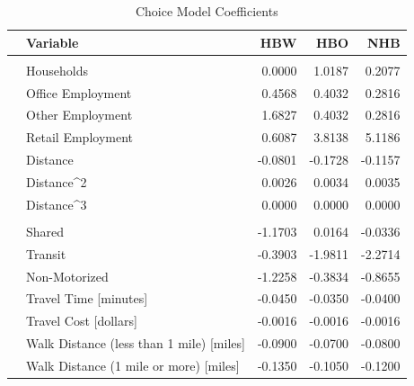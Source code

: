 \begin{table}

\caption{\label{tab:coeffs}Choice Model Coefficients}
\centering
\begin{tabular}[t]{llrrr}
\toprule
 & Variable & HBW & HBO & NHB\\
\midrule
\addlinespace[0.3em]
\multicolumn{5}{l}{\textbf{Destination Choice}}\\
\hspace{1em} & Households & 0.0000 & 1.0187 & 0.2077\\

\hspace{1em} & Office Employment & 0.4568 & 0.4032 & 0.2816\\

\hspace{1em} & Other Employment & 1.6827 & 0.4032 & 0.2816\\

\hspace{1em} & Retail Employment & 0.6087 & 3.8138 & 5.1186\\

\hspace{1em} & Distance & -0.0801 & -0.1728 & -0.1157\\

\hspace{1em} & Distance\textasciicircum{}2 & 0.0026 & 0.0034 & 0.0035\\

\hspace{1em} & Distance\textasciicircum{}3 & 0.0000 & 0.0000 & 0.0000\\
\cmidrule{1-5}
\addlinespace[0.3em]
\multicolumn{5}{l}{\textbf{Mode Choice}}\\
\hspace{1em} & Shared & -1.1703 & 0.0164 & -0.0336\\

\hspace{1em} & Transit & -0.3903 & -1.9811 & -2.2714\\

\hspace{1em} & Non-Motorized & -1.2258 & -0.3834 & -0.8655\\

\hspace{1em} & Travel Time [minutes] & -0.0450 & -0.0350 & -0.0400\\

\hspace{1em} & Travel Cost [dollars] & -0.0016 & -0.0016 & -0.0016\\

\hspace{1em} & Walk Distance (less than 1 mile) [miles] & -0.0900 & -0.0700 & -0.0800\\

\hspace{1em} & Walk Distance (1 mile or more) [miles] & -0.1350 & -0.1050 & -0.1200\\
\bottomrule
\end{tabular}
\end{table}


